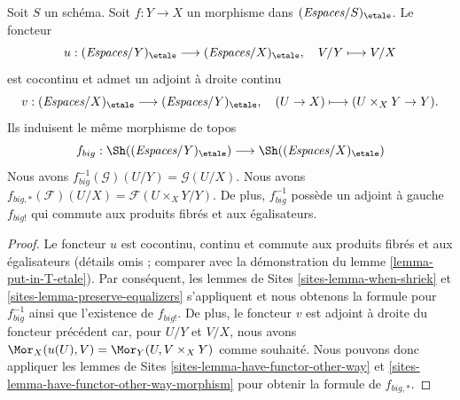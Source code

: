 \begin{lemma}
\label{lemma-morphism-big-etale}
Soit $S$ un schéma. Soit $f : Y \to X$ un morphisme dans
$(\textit{Espaces}/S)_\etale$. Le foncteur
$$
u :
(\textit{Espaces}/Y)_\etale
\longrightarrow
(\textit{Espaces}/X)_\etale,
\quad
V/Y \longmapsto V/X
$$
est cocontinu et admet un adjoint à droite continu
$$
v :
(\textit{Espaces}/X)_\etale
\longrightarrow
(\textit{Espaces}/Y)_\etale,
\quad
(U \to X) \longmapsto (U \times_X Y \to Y).
$$
Ils induisent le même morphisme de topos
$$
f_{big} :
\Sh((\textit{Espaces}/Y)_\etale)
\longrightarrow
\Sh((\textit{Espaces}/X)_\etale)
$$
Nous avons $f_{big}^{-1}(\mathcal{G})(U/Y) = \mathcal{G}(U/X)$.
Nous avons $f_{big, *}(\mathcal{F})(U/X) = \mathcal{F}(U \times_X Y/Y)$.
De plus, $f_{big}^{-1}$ possède un adjoint à gauche $f_{big!}$ qui commute aux
produits fibrés et aux égalisateurs.
\end{lemma}

\begin{proof}
Le foncteur $u$ est cocontinu, continu et commute aux produits fibrés
et aux égalisateurs (détails omis ; comparer avec la démonstration du
lemme \ref{lemma-put-in-T-etale}).
Par conséquent,
les lemmes de Sites \ref{sites-lemma-when-shriek} et
\ref{sites-lemma-preserve-equalizers}
s'appliquent et nous obtenons la formule
pour $f_{big}^{-1}$ ainsi que l'existence de $f_{big!}$. De plus,
le foncteur $v$ est adjoint à droite du foncteur précédent car, pour $U/Y$ et $V/X$,
nous avons $\Mor_X(u(U), V) = \Mor_Y(U, V \times_X Y)$
comme souhaité. Nous pouvons donc appliquer
les lemmes de Sites \ref{sites-lemma-have-functor-other-way} et
\ref{sites-lemma-have-functor-other-way-morphism} pour obtenir la
formule de $f_{big, *}$.
\end{proof}

